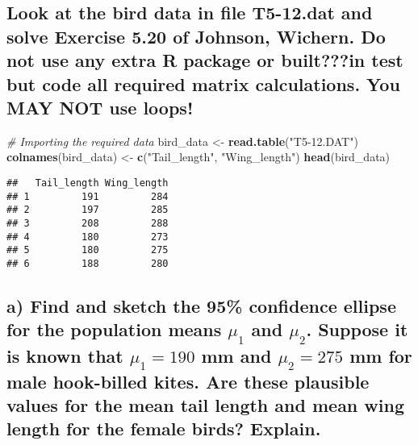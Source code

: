 \documentclass[]{article}
\newenvironment{Shaded}{\begin{snugshade}}{\end{snugshade}}
\newcommand{\KeywordTok}[1]{\textcolor[rgb]{0.13,0.29,0.53}{\textbf{#1}}}
\newcommand{\StringTok}[1]{\textcolor[rgb]{0.31,0.60,0.02}{#1}}
\newcommand{\CommentTok}[1]{\textcolor[rgb]{0.56,0.35,0.01}{\textit{#1}}}
\newcommand{\NormalTok}[1]{#1}
\begin{document}
\subsection{Look at the bird data in file T5-12.dat and solve Exercise
5.20 of Johnson, Wichern. Do not use any extra R package or built???in
test but code all required matrix calculations. You MAY NOT use
loops!}\label{look-at-the-bird-data-in-file-t5-12.dat-and-solve-exercise-5.20-of-johnson-wichern.-do-not-use-any-extra-r-package-or-builtin-test-but-code-all-required-matrix-calculations.-you-may-not-use-loops}

\begin{Shaded}
\begin{Highlighting}[]
\CommentTok{# Importing the required data}
\NormalTok{bird_data <-}\StringTok{ }\KeywordTok{read.table}\NormalTok{(}\StringTok{"T5-12.DAT"}\NormalTok{)}
\KeywordTok{colnames}\NormalTok{(bird_data) <-}\StringTok{ }\KeywordTok{c}\NormalTok{(}\StringTok{"Tail_length"}\NormalTok{, }\StringTok{"Wing_length"}\NormalTok{)}
\KeywordTok{head}\NormalTok{(bird_data)}
\end{Highlighting}
\end{Shaded}

\begin{verbatim}
##   Tail_length Wing_length
## 1         191         284
## 2         197         285
## 3         208         288
## 4         180         273
## 5         180         275
## 6         188         280
\end{verbatim}

\subsection{\texorpdfstring{a) Find and sketch the 95\% confidence
ellipse for the population means \(\mu_1\) and \(\mu_2\). Suppose it is
known that \(\mu_1 = 190\) mm and \(\mu_2 = 275\) mm for male
hook-billed kites. Are these plausible values for the mean tail length
and mean wing length for the female birds?
Explain.}{a) Find and sketch the 95\% confidence ellipse for the population means \textbackslash{}mu\_1 and \textbackslash{}mu\_2. Suppose it is known that \textbackslash{}mu\_1 = 190 mm and \textbackslash{}mu\_2 = 275 mm for male hook-billed kites. Are these plausible values for the mean tail length and mean wing length for the female birds? Explain.}}\label{a-find-and-sketch-the-95-confidence-ellipse-for-the-population-means-mu_1-and-mu_2.-suppose-it-is-known-that-mu_1-190-mm-and-mu_2-275-mm-for-male-hook-billed-kites.-are-these-plausible-values-for-the-mean-tail-length-and-mean-wing-length-for-the-female-birds-explain.}
\end{document}
